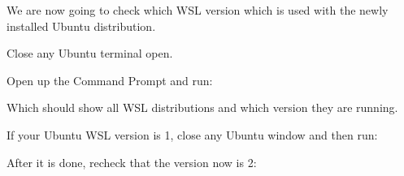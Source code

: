 We are now going to check which WSL version which is used with the newly installed Ubuntu distribution.

Close any Ubuntu terminal open.

Open up the Command Prompt  and run:


Which should show all WSL distributions and which version they are running.

If your Ubuntu WSL version is 1, close any Ubuntu window and then run:


After it is done, recheck that the version now is 2:

